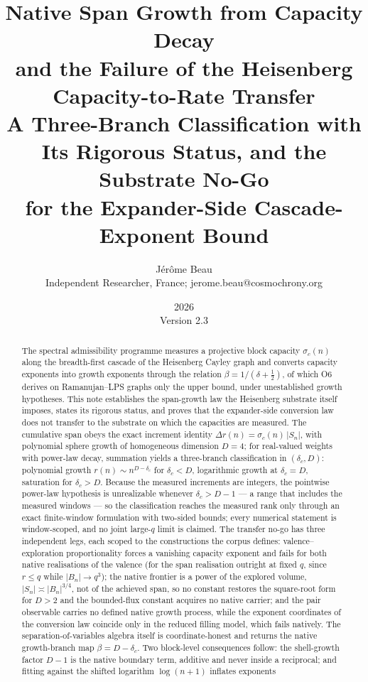 \documentclass[11pt,a4paper]{article}
\title{Native Span Growth from Capacity Decay\\
  and the Failure of the Heisenberg Capacity-to-Rate Transfer\\
  \large A Three-Branch Classification with Its Rigorous Status, and the Substrate No-Go\\
  \large for the Expander-Side Cascade-Exponent Bound}
\author{J\'er\^ome Beau\\
  \small Independent Researcher, France; jerome.beau@cosmochrony.org}
\date{2026\\[2pt]\small Version 2.3}
\theoremstyle{definition}
\newcommand{\dc}{\delta_c}
\begin{document}
\maketitle

\begin{abstract}
The spectral admissibility programme measures a projective block capacity $\sigma_c(n)$ along the
breadth-first cascade of the Heisenberg Cayley graph and converts capacity exponents into growth exponents
through the relation $\beta = 1/(\delta + \tfrac{1}{2})$, of which O6 derives on Ramanujan--LPS graphs only the
upper bound, under unestablished growth hypotheses.
This note establishes the span-growth law the Heisenberg substrate itself imposes, states its rigorous
status, and proves that the expander-side conversion law does not transfer to the substrate on which the
capacities are measured.
The cumulative span obeys the exact increment identity $\Delta r(n) = \sigma_c(n)\,|S_n|$, with polynomial
sphere growth of homogeneous dimension $D = 4$; for real-valued weights with power-law decay, summation
yields a three-branch classification in $(\dc, D)$: polynomial growth $r(n) \sim n^{D-\dc}$ for $\dc < D$,
logarithmic growth at $\dc = D$, saturation for $\dc > D$.
Because the measured increments are integers, the pointwise power-law hypothesis is unrealizable whenever
$\dc > D - 1$ --- a range that includes the measured windows --- so the classification reaches the measured
rank only through an exact finite-window formulation with two-sided bounds; every numerical statement is
window-scoped, and no joint large-$q$ limit is claimed.
The transfer no-go has three independent legs, each scoped to the constructions the corpus defines:
valence--exploration proportionality forces a vanishing capacity exponent and fails for both native
realisations of the valence (for the span realisation outright at fixed $q$, since $r \le q$ while
$|B_n| \to q^3$); the native frontier is a power of the explored volume, $|S_n| \asymp |B_n|^{3/4}$, not of
the achieved span, so no constant restores the square-root form for $D > 2$ and the bounded-flux constant
acquires no native carrier; and the pair observable carries no defined native growth process, while the
exponent coordinates of the conversion law coincide only in the reduced filling model, which fails
natively.
The separation-of-variables algebra itself is coordinate-honest and returns the native growth-branch map
$\beta = D - \dc$.
Two block-level consequences follow: the shell-growth factor $D - 1$ is the native boundary term, additive
and never inside a reciprocal; and fitting against the shifted logarithm $\log(n{+}1)$ inflates exponents

\end{abstract}
\end{document}
